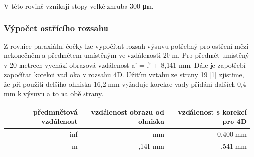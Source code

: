 \documentclass[
]{article}
\begin{document}
V této rovině vznikají stopy velké zhruba 300 μm.

\hypertarget{vuxfdpoux10det-ostux159uxedcuxedho-rozsahu}{%
\subsubsection{Výpočet ostřícího
rozsahu}\label{vuxfdpoux10det-ostux159uxedcuxedho-rozsahu}}

Z rovnice paraxiální čočky lze vypočítat rozsah výsuvu potřebný pro
ostření mězi nekonečněm a předmětem umístěným ve vzdálenosti 20 m. Pro
předmět umístěný v 20 metrech vychází obrazová vzdálenost a' = f' +
8,141 mm. Dále je zapotřebí započítat korekci vad oka v rozsahu 4D.
Užitím vztahu ze strany 19 {[}\protect\hyperlink{lit}{1}{]} zjistíme, že
při použití delšího ohniska 16,2 mm vyžaduje korekce vady přidání
dalších 0,4 mm k výsuvu a to na obě strany.

\begin{longtable}[]{@{}rrr@{}}
\toprule
\begin{minipage}[b]{0.33\columnwidth}\raggedleft
předmnětová vzdálenost\strut
\end{minipage} & \begin{minipage}[b]{0.43\columnwidth}\raggedleft
vzdálenost obrazu od ohniska\strut
\end{minipage} & \begin{minipage}[b]{0.15\columnwidth}\raggedleft
vzdálenost s korekcí pro 4D\strut
\end{minipage}\tabularnewline
\midrule
\endhead
\begin{minipage}[t]{0.33\columnwidth}\raggedleft
inf\strut
\end{minipage} & \begin{minipage}[t]{0.43\columnwidth}\raggedleft
0 mm\strut
\end{minipage} & \begin{minipage}[t]{0.15\columnwidth}\raggedleft
- 0,400 mm\strut
\end{minipage}\tabularnewline
\begin{minipage}[t]{0.33\columnwidth}\raggedleft
20 m\strut
\end{minipage} & \begin{minipage}[t]{0.43\columnwidth}\raggedleft
8,141 mm\strut
\end{minipage} & \begin{minipage}[t]{0.15\columnwidth}\raggedleft
8,541 mm\strut
\end{minipage}\tabularnewline
\bottomrule
\end{longtable}
\end{document}
